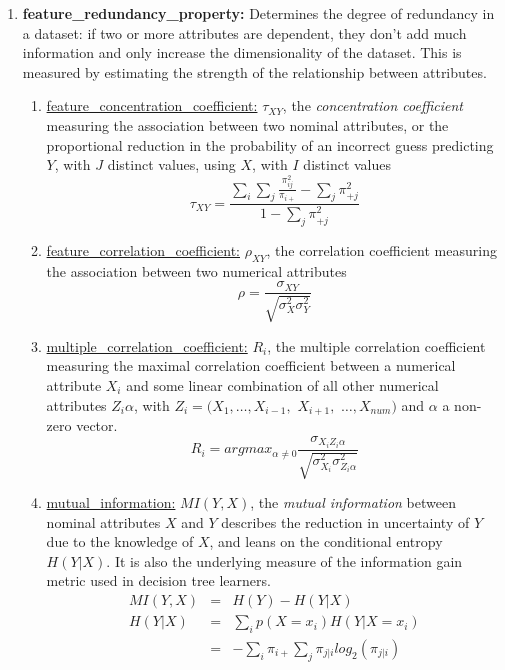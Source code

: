 \documentclass[a4paper,12pt, english]{article}
\begin{document}
\begin{enumerate}
\begin{enumerate}
\begin{enumerate}
			\item \textbf{feature\_redundancy\_property:} Determines the degree of redundancy in a dataset: if two or more attributes are dependent, they don't add much information and only increase the dimensionality of the dataset. This is measured by estimating the strength of the relationship between attributes.
				\begin{enumerate}
				\item \underline{feature\_concentration\_coefficient:} $\tau_{XY}$, the \emph{concentration coefficient} measuring the association between two nominal attributes, or the proportional reduction in the probability of an incorrect guess predicting $Y$, with $J$ distinct values, using $X$, with $I$ distinct values \begin{equation} \tau_{XY}=\frac{\sum_{i}\sum_{j}\frac{\pi^{2}_{ij}}{\pi_{i+}}-\sum_{j}\pi^{2}_{+j}}{1-\sum_{j}\pi^{2}_{+j}} \end{equation}
				\item \underline{feature\_correlation\_coefficient:} $\rho_{XY}$, the correlation coefficient measuring the association between two numerical attributes \begin{equation} \rho=\frac{\sigma_{XY}}{\sqrt{\sigma_{X}^{2}\sigma_{Y}^{2}}} \label{eq:rho} \end{equation}
				\item \underline{multiple\_correlation\_coefficient:} $R_{i}$, the multiple correlation coefficient measuring the maximal correlation coefficient between a numerical attribute $X_{i}$ and some linear combination of all other numerical attributes $Z_{i}\alpha$, with $Z_{i}=(X_{1},\ldots,X_{i-1},$ $X_{i+1},$ $\ldots,X_{num})$ and $\alpha$ a non-zero vector. \begin{equation} R_{i}=argmax_{\alpha\neq0} \frac{\sigma_{X_{i}Z_{i}\alpha}} {\sqrt{\sigma_{X_{i}}^{2}\sigma_{Z_{i}\alpha}^{2} } } \end{equation}
				\item \underline{mutual\_information:} $MI(Y,X)$, the \emph{mutual information} between nominal attributes $X$ and $Y$ describes the reduction in uncertainty of $Y$ due to the knowledge of $X$, and leans on the conditional entropy $H(Y|X)$. It is also the underlying measure of the information gain metric used in decision tree learners. \begin{eqnarray} MI(Y,X)&=&H(Y)-H(Y|X) \\ H(Y|X)&=&\sum_{i}p(X=x_{i})H(Y|X=x_{i}) \\ &=&-\sum_{i}\pi_{i+} \sum_{j}\pi_{j|i}log_{2}(\pi_{j|i}) \end{eqnarray}

\end{enumerate}
\end{enumerate}
\end{enumerate}
\end{enumerate}
\end{document}
